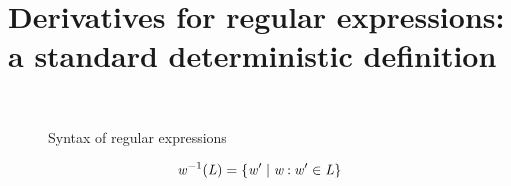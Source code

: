 \section{Derivatives for regular expressions: a standard deterministic definition}\label{regExp}

\begin{figure}[h]
 \begin{small}
  \begin{center}
   \begin{grammar}
     \\
   \end{grammar}
  \end{center}
 \end{small}
 \caption{Syntax of regular expressions}
 \label{regExpSyn}
\end{figure}

\begin{definition}
 \[
  \mathit {w}^{-1}(\mathit {L}) = \{ \mathit {w}' \mid \mathit {w}\mathbin{:}\mathit {w}'\in\mathit {L} \}
 \]
\end{definition}

